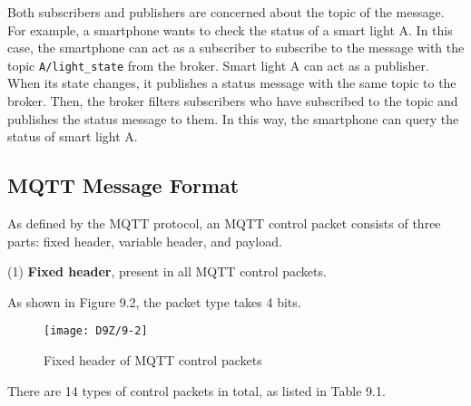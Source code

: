 \documentclass[a4paper,12pt]{book}
\begin{document}
Both subscribers and publishers are concerned about the topic of the message. For example, a smartphone wants to check the status of a smart light A. In this case, the smartphone can act as a subscriber to subscribe to the message with the topic \verb|A/light_state| from the broker. Smart light A can act as a publisher. When its state changes, it publishes a status message with the same topic to the broker. Then, the broker filters subscribers who have subscribed to the topic and publishes the status message to them. In this way, the smartphone can query the status of smart light A.

\subsection{MQTT Message Format}
As defined by the MQTT protocol, an MQTT control packet consists of three parts: fixed header, variable header, and payload.

(1) \textbf{Fixed header}, present in all MQTT control packets.

As shown in Figure 9.2, the packet type takes 4 bits.

\begin{figure}[!h]
    \centering
    \texttt{[image: D9Z/9-2]}
    \caption{Fixed header of MQTT control packets}
\end{figure}

There are 14 types of control packets in total, as listed in Table 9.1.
\end{document}
